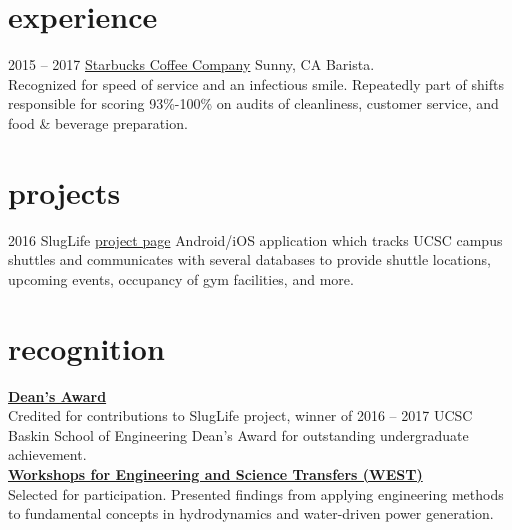 \documentclass[]{./friggeri-cv}
\begin{document}
\section{experience}
\begin{entrylist}
\entry
    {2015 -- 2017}
    {\href{http://wisequacks.org/wp2/wp-content/uploads/2012/05/coffee.jpg}{Starbucks Coffee Company}}
    {Sunny, CA}
    {{\rolefont Barista.}\\Recognized for speed of service and an infectious smile.
    Repeatedly part of shifts responsible for scoring 93\%-100\% on audits of
    cleanliness, customer service, and food \& beverage preparation.}
\end{entrylist}\vspace{-1.5em}
\section{projects}%
\begin{entrylist}
  \entry
    {2016}
    {SlugLife}
    {\href{https://sites.google.com/a/ucsc.edu/sluglife/}{project page}}
    {Android/iOS application which tracks UCSC campus shuttles and
    communicates with several databases to provide shuttle locations, upcoming
    events, occupancy of gym facilities, and more.}
\end{entrylist}\vspace{-1.5em}
%
\section{recognition}
    {\href{http://honors.ucsc.edu/awards/dca/index.html}{\bf Dean's Award}}\\
    Credited for contributions to SlugLife project, winner of
    2016 -- 2017 UCSC Baskin School of Engineering Dean's Award for outstanding
    undergraduate achievement.%
    \newline\\
    {\href{http://isee.ucsc.edu/programs/west/index.html}%
    {\bf Workshops for Engineering and Science Transfers (WEST)}}\\
    {Selected for participation. Presented findings from applying 
    engineering methods to fundamental concepts in hydrodynamics and 
    water-driven power generation.}
\end{document}
